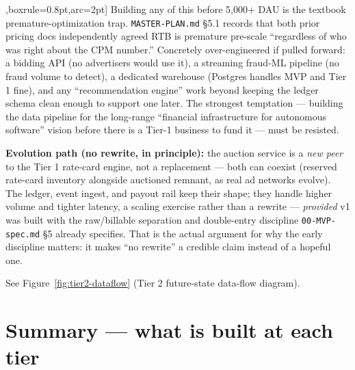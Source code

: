 \begin{tcolorbox}[colback=red!5,colframe=red!60!black,title=[OVER-ENGINEERING RISK --- flagged explicitly],boxrule=0.8pt,arc=2pt]
Building any of this before 5,000+ DAU is the textbook premature-optimization trap. \texttt{MASTER-PLAN.md} \S5.1 records that both prior pricing docs independently agreed RTB is premature pre-scale ``regardless of who was right about the CPM number.'' Concretely over-engineered if pulled forward: a bidding API (no advertisers would use it), a streaming fraud-ML pipeline (no fraud volume to detect), a dedicated warehouse (Postgres handles MVP and Tier 1 fine), and any ``recommendation engine'' work beyond keeping the ledger schema clean enough to support one later. The strongest temptation --- building the data pipeline for the long-range ``financial infrastructure for autonomous software'' vision before there is a Tier-1 business to fund it --- must be resisted.
\end{tcolorbox}

\textbf{Evolution path (no rewrite, in principle):} the auction service is a \textit{new peer} to the Tier 1 rate-card engine, not a replacement --- both can coexist (reserved rate-card inventory alongside auctioned remnant, as real ad networks evolve). The ledger, event ingest, and payout rail keep their shape; they handle higher volume and tighter latency, a scaling exercise rather than a rewrite --- \textit{provided} v1 was built with the raw/billable separation and double-entry discipline \texttt{00-MVP-spec.md} \S5 already specifies. That is the actual argument for why the early discipline matters: it makes ``no rewrite'' a credible claim instead of a hopeful one.

See Figure~\ref{fig:tier2-dataflow} (Tier 2 future-state data-flow diagram).

\section{Summary --- what is built at each tier}
\label{sec:tier-summary}

